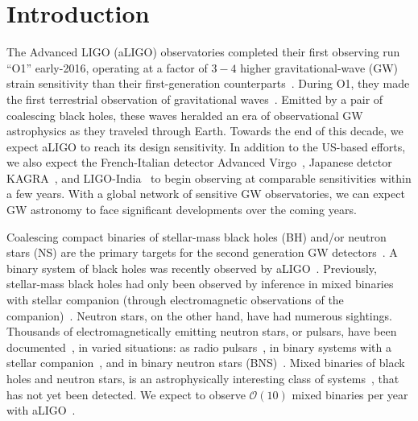\documentclass[aps,prd,amsmath,floats,floatfix, twocolumn,
superscriptaddress,nofootinbib,showpacs]{revtex4-1}
\newcommand{\red}{\textcolor{red}}
\begin{document}
\maketitle

\section{Introduction}\label{s1:introduction}

The Advanced LIGO (aLIGO) observatories completed their first observing run ``O1''
early-2016, operating at a factor of $3-4$ higher gravitational-wave
(GW) strain sensitivity than their first-generation 
counterparts~\cite{Shoemaker2009}.
% 
During O1, they made the first terrestrial observation of gravitational 
waves~\cite{LIGOVirgo2016a}. Emitted by a pair of coalescing black holes, these
waves heralded an era of observational GW astrophysics as they traveled 
through Earth.
% 
Towards the end of this decade, we expect aLIGO to reach its design sensitivity.
In addition to the US-based efforts, we also expect the French-Italian detector Advanced
Virgo~\cite{aVIRGO,aVirgo2}, Japanese detctor KAGRA~\cite{kagra,Somiya:2011np},
and LIGO-India~\cite{2013IJMPD..2241010U} to begin observing at comparable
sensitivities within a few years. With a global network of sensitive GW
 observatories, we can expect GW astronomy to face significant developments over the
coming years.
% 

Coalescing compact binaries of stellar-mass black holes (BH) and/or
neutron stars (NS) are the primary targets for the second
generation GW detectors~\cite{Timmes:1995kp,Fryer:1999mi,RevModPhys.74.1015,
2010ApJ...714.1217B,2010ApJ...715L.138B,Dominik:2014yma,Belczynski:2006zi,
2012ApJ...749...91F,
Wex:1998wt,1991ApJ...379L..17N,Mandel:2015spa,Abbott:2016nhf}.
A binary system of black holes was recently observed by 
aLIGO~\cite{LIGOVirgo2016a}. Previously, stellar-mass black holes had only 
been observed by inference in mixed binaries with stellar companion (through
electromagnetic observations of the companion)~\cite{Lewin2010,
Remillard:2006fc,Fragos:2010tm}.
Neutron stars, on the other hand, have had numerous sightings. Thousands of
electromagnetically emitting neutron stars, or pulsars, have been 
documented~\cite{Manchester:2004bp},
in varied situations: as radio pulsars~\cite{Lattimer:2012nd,Manchester:2004bp},
in binary systems with a stellar companion~\cite{1971ApJ...169L..23M,
Bond:2002eh,Lattimer:2012nd,Manchester:2004bp},
and in binary neutron stars (BNS)~\cite{Hulse:1975uf,Taylor:1982wi,
Weisberg:2010zz,Lattimer:2012nd,Manchester:2004bp}.
Mixed binaries of black holes and neutron stars, is an astrophysically
interesting class of systems~\cite{Wex:1998wt,
1991ApJ...379L..17N,Janka1999,Fryer:2015jpa}, that has not yet been detected.
We expect to observe $\mathcal{O}(10)$ mixed binaries per year with
aLIGO~\cite{Abadie:2010cf}.
\end{document}
